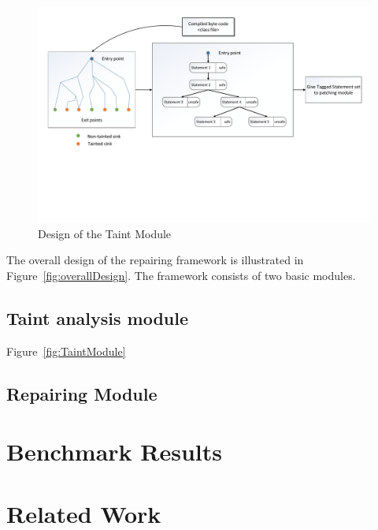 \documentclass{sigplanconf}
\begin{document}
\begin{figure}
\centering
  \includegraphics[width= 7.0in]{images/TaintModule.pdf}
  \caption{Design of the Taint Module}
\end{figure}


The overall design of the repairing framework is illustrated in
Figure~\ref{fig:overallDesign}. The framework consists of two basic modules.


\subsection{Taint analysis module}
\label{subsec:TaintModule}

Figure~\ref{fig:TaintModule}


\subsection{Repairing Module}
\label{subsec:RepairingModule}




\section{Benchmark Results}
\label{sec:bench}

\section{Related Work}
\label{sec:rel}
\end{document}
